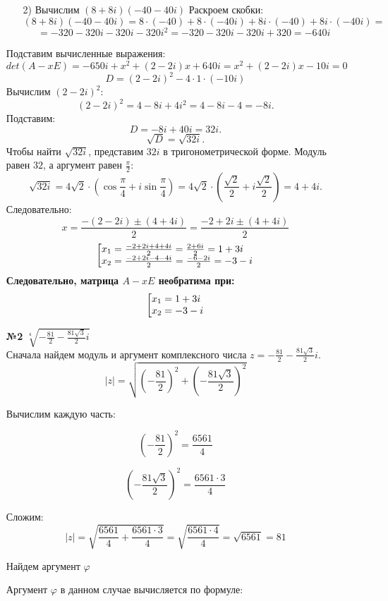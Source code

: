 \documentclass[a4paper]{article}
\makeatletter
\newcommand{\gath}[1]{\left[ \begin{array}{@{}l@{}} #1 \end{array} \right.}
\makeatother
\begin{document}
\begin{enumerate}
\begin{enumerate}
        \item[2)]Вычислим $(8 + 8i)(-40 - 40i)$
        Раскроем скобки:
        $$
        (8 + 8i)(-40 - 40i) = 8 \cdot (-40) + 8 \cdot (-40i) + 8i \cdot (-40) + 8i \cdot (-40i)=
        $$
        $$
        = -320 - 320i - 320i - 320i^2 = -320 - 320i - 320i + 320 = -640i
        $$
    \end{enumerate}
    Подставим вычисленные выражения:
    $$det(A - x E) = -650i + x^2 + (2 - 2i)x  +640i = x^2 + (2 - 2i)x  -10i = 0$$
    $$D = (2 - 2i)^2 - 4 \cdot 1 \cdot (-10i)$$
    Вычислим $(2 - 2i)^2 $:
    $$
    (2 - 2i)^2 = 4 - 8i + 4i^2 = 4 - 8i - 4 = -8i.
    $$
    Подставим:
    $$
    D = -8i + 40i = 32i.
    $$
    $$
    \sqrt{D} = \sqrt{32i}.
    $$
    Чтобы найти $\sqrt{32i}$, представим $32i$ в тригонометрической форме. Модуль равен $32$, а аргумент равен $\frac{\pi}{2}$:
    $$
    \sqrt{32i} = 4\sqrt{2} \cdot \left(\cos\frac{\pi}{4} + i\sin\frac{\pi}{4}\right) = 4\sqrt{2} \cdot \left(\frac{\sqrt{2}}{2} + i\frac{\sqrt{2}}{2}\right) = 4 + 4i.
    $$
    Следовательно:
    $$
    x = \frac{-(2 - 2i) \pm (4 + 4i)}{2}=\frac{-2 + 2i \pm (4 + 4i)}{2}
    $$
    $$
    \gath{
        x_1 = \frac{-2 + 2i + 4 + 4i}{2} = \frac{2 + 6i}{2} = 1 + 3i\\
        x_2 = \frac{-2 + 2i - 4 - 4i}{2} = \frac{-6 - 2i}{2} = -3 - i
    }
    $$
    \textbf{Следовательно, матрица $ A - x E $ необратима при:}
    $$
    \gath{
        x_1 = 1 + 3i\\
        x_2 = -3 - i
    }
    $$
    \item[\textbf{№2}]$\sqrt[4]{-\frac{81}{2} - \frac{81\sqrt{3}}{2}i}$\\
    Сначала найдем модуль и аргумент комплексного числа $ z = -\frac{81}{2} - \frac{81 \sqrt{3}}{2} i $.
    $$
    |z| = \sqrt{\left(-\frac{81}{2}\right)^2 + \left(-\frac{81 \sqrt{3}}{2}\right)^2}
    $$
    
    Вычислим каждую часть:

    $$
    \left(-\frac{81}{2}\right)^2 = \frac{6561}{4}
    $$
    
    $$
    \left(-\frac{81 \sqrt{3}}{2}\right)^2 = \frac{6561 \cdot 3}{4} 
    $$

    Сложим:
    $$
    |z| = \sqrt{\frac{6561}{4} + \frac{6561 \cdot 3}{4}} = \sqrt{\frac{6561\cdot 4}{4}} = \sqrt{6561} = 81
    $$

    Найдем аргумент $ \varphi $

    Аргумент $ \varphi $ в данном случае вычисляется по формуле:


\end{enumerate}
\end{document}
